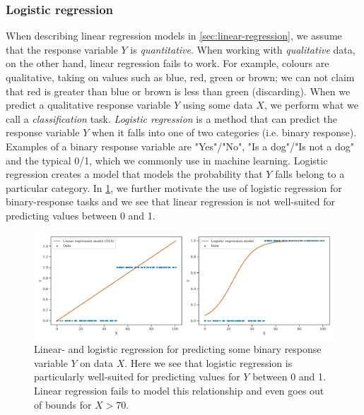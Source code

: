 \subsubsection{Logistic regression}
\label{sec:logistic-regression}
When describing linear regression models in \cref{sec:linear-regression}, we assume that the response variable $Y$ is \textit{quantitative}. When working with \textit{qualitative} data, on the other hand, linear regression fails to work. For example, colours are qualitative, taking on values such as blue, red, green or brown; we can not claim that red is greater than blue or brown is less than green (discarding). When we predict a qualitative response variable $Y$ using some data $X$, we perform what we call a \textit{classification} task. \textit{Logistic regression} is a method that can predict the response variable $Y$ when it falls into one of two categories (i.e. binary response). Examples of a binary response variable are "Yes"/"No", "Is a dog"/"Is not a dog" and the typical 0/1, which we commonly use in machine learning. Logistic regression creates a model that models the probability that $Y$ falls belong to a particular category. In \cref{fig:logistic-regression-example}, we further motivate the use of logistic regression for binary-response tasks and we see that linear regression is not well-suited for predicting values between 0 and 1.
\begin{figure}[H]
    \centering
    \includegraphics[width=\textwidth]{thesis/figures/logistic-regression-example.pdf}
    \caption{Linear- and logistic regression for predicting some binary response variable $Y$ on data $X$. Here we see that logistic regression is particularly well-suited for predicting values for $Y$ between 0 and 1. Linear regression fails to model this relationship and even goes out of bounds for $X > 70$.}
    \label{fig:logistic-regression-example}
\end{figure}

